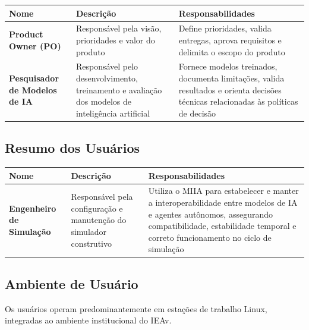 \begin{table}[h]
    \begin{tabular}{| p{} | p{} | p{} |}
        \hline Nome & Descrição & Responsabilidades \\ \hline
        
        \textbf{Product Owner (PO)} &
        Responsável pela visão, prioridades e valor do produto &
        Define prioridades, valida entregas, aprova requisitos e delimita o escopo do produto \\ \hline
        
        \textbf{Pesquisador de Modelos de IA} &
        Responsável pelo desenvolvimento, treinamento e avaliação dos modelos de inteligência artificial &
        Fornece modelos treinados, documenta limitações, valida resultados e orienta decisões técnicas relacionadas às políticas de decisão \\ \hline

    \end{tabular}
\end{table}

\subsection{Resumo dos Usuários}

\begin{table}[h]
    \begin{tabular}{| p{} | p{} | p{} |}
        \hline Nome & Descrição & Responsabilidades \\ \hline
              
        \textbf{Engenheiro de Simulação} &
        Responsável pela configuração e manutenção do simulador construtivo &
        Utiliza o MIIA para estabelecer e manter a interoperabilidade entre modelos de IA e agentes autônomos, assegurando compatibilidade, estabilidade temporal e correto funcionamento no ciclo de simulação \\ \hline

    \end{tabular}
\end{table}

\subsection{Ambiente de Usuário}

Os usuários operam predominantemente em estações de trabalho Linux, integradas ao ambiente institucional do IEAv.

